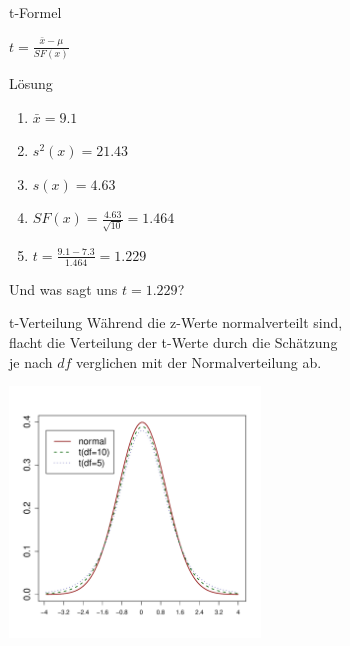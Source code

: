 \begin{frame}
  {t-Formel}
  \begin{center}
    \alert{$t=\frac{\bar{x}-\mu}{SF(x)}$}
  \end{center}
  \vspace{1cm}
\end{frame}

\begin{frame}
  {Lösung}
  \begin{enumerate}[<+->]
    \item $\bar{x}=9.1$
    \item $s^2(x)=21.43$
    \item $s(x)=4.63$
    \item $SF(x)=\frac{4.63}{\sqrt{10}}=1.464$
    \item $t=\frac{9.1-7.3}{1.464}=1.229$
  \end{enumerate}
  \pause
  \begin{center}
    \alert{Und was sagt uns $t=1.229$?}
  \end{center}
\end{frame}

\begin{frame}
  {t-Verteilung}
    Während die z-Werte normalverteilt sind,\\
    flacht die Verteilung der t-Werte durch die Schätzung\\
    je nach $df$ verglichen mit der Normalverteilung ab.\\
    \vspace{-0.5cm}
    \begin{center}
      \includegraphics[width=0.5\textwidth]{graphics/tnorm}
    \end{center}
\end{frame}

